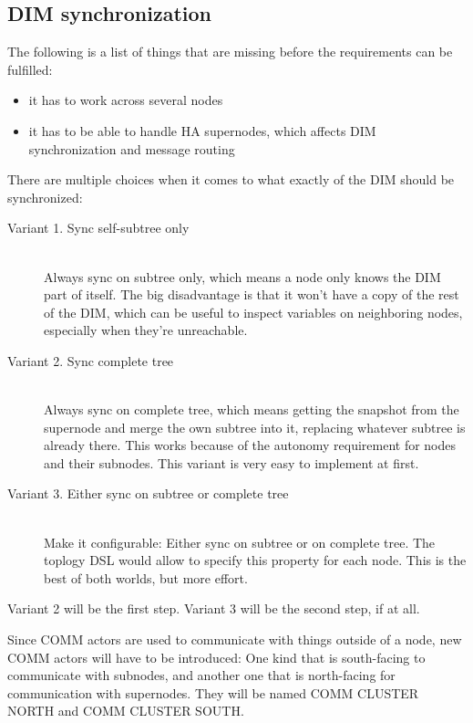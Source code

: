 \subsection{DIM synchronization}
The following is a list of things that are missing before the requirements can be fulfilled:
\begin{itemize}
\item it has to work across several nodes
\item it has to be able to handle HA supernodes, which affects DIM synchronization and message routing
\end{itemize}

There are multiple choices when it comes to what exactly of the DIM should be synchronized:

\begin{description}
	\item [Variant 1. Sync self-subtree only] \hfill\\
	Always sync on subtree only, which means a node only knows the DIM part of
	itself. The big disadvantage is that it won't have a copy of the rest of the
	DIM, which can be useful to inspect variables on neighboring nodes, especially
	when they're unreachable.

	\item [Variant 2. Sync complete tree] \hfill\\
	Always sync on complete tree, which means getting the snapshot from the
	supernode and merge the own subtree into it, replacing whatever subtree is
	already there. This works because of the autonomy requirement for nodes and
	their subnodes. This variant is very easy to implement at first.

	\item [Variant 3. Either sync on subtree or complete tree] \hfill\\
	Make it configurable: Either sync on subtree or on complete tree. The
	toplogy DSL would allow to specify this property for each node. This is
	the best of both worlds, but more effort.
\end{description}

Variant 2 will be the first step. Variant 3 will be the second step, if at all.

Since COMM actors are used to communicate with things outside of a node, new COMM
actors will have to be introduced: One kind that is south-facing to communicate
with subnodes, and another one that is north-facing for communication with
supernodes. They will be named COMM CLUSTER NORTH and COMM CLUSTER SOUTH.

